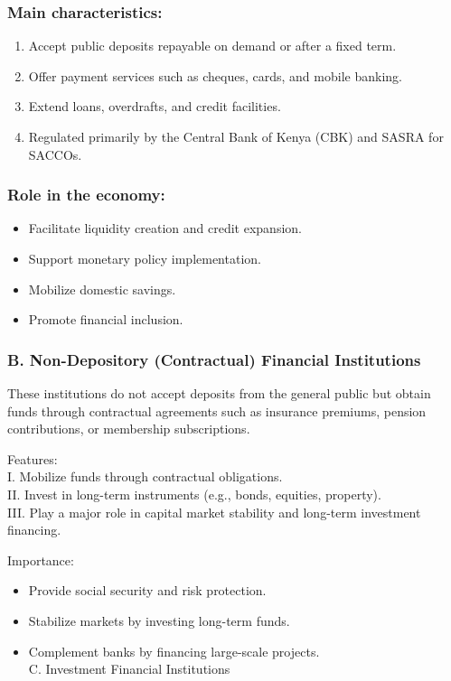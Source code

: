 \documentclass[10pt]{article}
\begin{document}
\subsubsection*{Main characteristics:}
\begin{enumerate}
  \item Accept public deposits repayable on demand or after a fixed term.
  \item Offer payment services such as cheques, cards, and mobile banking.
  \item Extend loans, overdrafts, and credit facilities.
  \item Regulated primarily by the Central Bank of Kenya (CBK) and SASRA for SACCOs.
\end{enumerate}

\subsubsection*{Role in the economy:}
\begin{itemize}
  \item Facilitate liquidity creation and credit expansion.
  \item Support monetary policy implementation.
  \item Mobilize domestic savings.
  \item Promote financial inclusion.
\end{itemize}

\subsubsection*{B. Non-Depository (Contractual) Financial Institutions}
These institutions do not accept deposits from the general public but obtain funds through contractual agreements such as insurance premiums, pension contributions, or membership subscriptions.

Features:\\
I. Mobilize funds through contractual obligations.\\
II. Invest in long-term instruments (e.g., bonds, equities, property).\\
III. Play a major role in capital market stability and long-term investment financing.

Importance:

\begin{itemize}
  \item Provide social security and risk protection.
  \item Stabilize markets by investing long-term funds.
  \item Complement banks by financing large-scale projects.\\
C. Investment Financial Institutions
\end{itemize}
\end{document}
